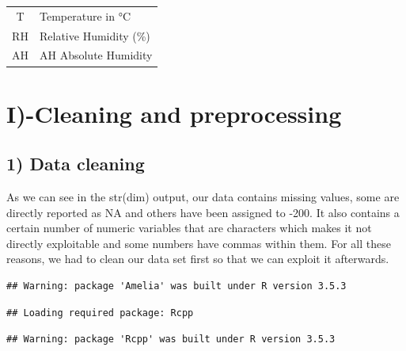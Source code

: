 \documentclass[]{article}
\begin{document}
\begin{longtable}[]{@{}cl@{}}
\begin{minipage}[t]{0.15\columnwidth}\centering\strut
T\strut
\end{minipage} & \begin{minipage}[t]{0.79\columnwidth}\raggedright\strut
Temperature in °C\strut
\end{minipage}\tabularnewline
\begin{minipage}[t]{0.15\columnwidth}\centering\strut
RH\strut
\end{minipage} & \begin{minipage}[t]{0.79\columnwidth}\raggedright\strut
Relative Humidity (\%)\strut
\end{minipage}\tabularnewline
\begin{minipage}[t]{0.15\columnwidth}\centering\strut
AH\strut
\end{minipage} & \begin{minipage}[t]{0.79\columnwidth}\raggedright\strut
AH Absolute Humidity\strut
\end{minipage}\tabularnewline
\bottomrule
\end{longtable}

\section{I)-Cleaning and preprocessing}\subsection{1) Data cleaning}

As we can see in the str(dim) output, our data contains missing values,
some are directly reported as NA and others have been assigned to -200.
It also contains a certain number of numeric variables that are
characters which makes it not directly exploitable and some numbers have
commas within them. For all these reasons, we had to clean our data set
first so that we can exploit it afterwards.

\begin{verbatim}
## Warning: package 'Amelia' was built under R version 3.5.3
\end{verbatim}

\begin{verbatim}
## Loading required package: Rcpp
\end{verbatim}

\begin{verbatim}
## Warning: package 'Rcpp' was built under R version 3.5.3
\end{verbatim}
\end{document}
